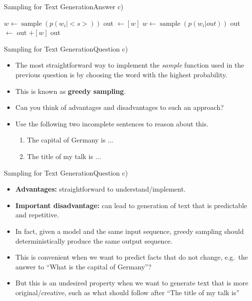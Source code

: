 \documentclass[t]{beamer}
\begin{document}
\begin{frame}{Sampling for Text Generation}{Answer c)}
    \begin{algorithmic}
        \STATE $w \leftarrow \operatorname{sample}(p(w_i|<s>))$
        \STATE out $\leftarrow [w]$
        \STATE $w \leftarrow \operatorname{sample}(p(w_i|out))$
        \STATE out $\leftarrow$ out $+ [w]$
        \ENDWHILE
        \RETURN out
    \end{algorithmic}
\end{frame}

\begin{frame}{Sampling for Text Generation}{Question c)}
    \begin{itemize}
        \item The most straightforward way to implement the \emph{sample}
              function used in the previous question is by choosing the word
              with the highest probability.
        \item This is known as \textbf{greedy sampling}.
        \item Can you think of advantages and disadvantages to such an approach?
        \item Use the following two incomplete sentences to reason about this.
              \begin{enumerate}
                  \item The capital of Germany is $\ldots$
                  \item The title of my talk is $\ldots$
              \end{enumerate}
    \end{itemize}
\end{frame}

\begin{frame}{Sampling for Text Generation}{Question c)}
    \begin{itemize}
        \item \textbf{Advantages:} straightforward to understand/implement.
        \item \textbf{Important disadvantage:} can lead to generation of text
              that is predictable and repetitive.
        \item In fact, given a model and the same input sequence, greedy
              sampling should deterministically produce the same output
              sequence.
        \item This is convenient when we want to predict facts that do not
              change, e.g.\ the answer to ``What is the capital of Germany''?
        \item But this is an undesired property when we want to generate text
              that is more original/creative, such as what should follow after
              ``The title of my talk is''
    \end{itemize}
\end{frame}
\end{document}
